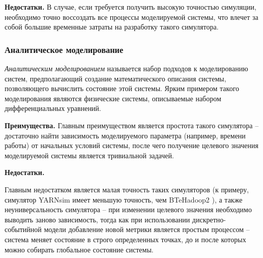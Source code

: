 \documentclass[../diploma.tex]{subfile}
\begin{document}
    {\bf Недостатки.}
    В случае, если требуется получить высокую точностью симуляции, необходимо
    точно воссоздать все процессы моделируемой системы, что влечет за собой
    большие временные затраты на разработку такого симулятора.


    \subsubsection{Аналитическое моделирование}
    \label{sec:simulation_methods:subsec:analytical_modeling}

    \textit{Аналитическим моделированием} называется набор подходов к
    моделированию систем, предполагающий создание математического описания
    системы, позволяющего вычислить состояние этой системы. Ярким примером
    такого моделирования являются физические системы, описываемые набором
    дифференциальных уравнений. 

    {\bf Преимущества.}
    Главным преимуществом является простота такого симулятора -- достаточно
    найти зависимость моделируемого параметра (например, времени работы) от
    начальных условий системы, после чего получение целевого значения
    моделируемой системы является тривиальной задачей.

    {\bf Недостатки.}

    Главным недостатком является малая точность таких симуляторов (к примеру,
    симулятор YARNsim \cite{yarnsim} имеет меньшую точность, чем BTeHadoop2
    \cite{baseline_model}), а также неуниверсальность симулятора -- при
    изменении целевого значения необходимо выводить заново зависимость, тогда
    как при использовании дискретно-событийной модели добавление новой метрики
    является простым процессом -- система меняет состояние в строго определенных
    точках, до и после которых можно собирать глобальное состояние системы.
\end{document}
